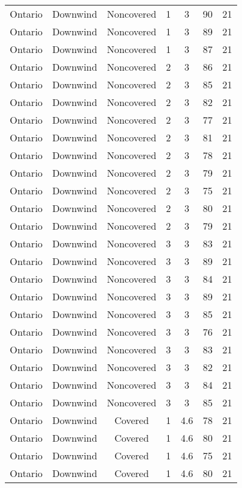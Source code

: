 \documentclass{article}
\begin{document}
\begin{longtable}[H]{ccccccc}
Ontario & Downwind & Noncovered & 1 & 3    & 90  & 21 \\
Ontario & Downwind & Noncovered & 1 & 3    & 89  & 21 \\
Ontario & Downwind & Noncovered & 1 & 3    & 87  & 21 \\
Ontario & Downwind & Noncovered & 2 & 3    & 86  & 21 \\
Ontario & Downwind & Noncovered & 2 & 3    & 85  & 21 \\
Ontario & Downwind & Noncovered & 2 & 3    & 82  & 21 \\
Ontario & Downwind & Noncovered & 2 & 3    & 77  & 21 \\
Ontario & Downwind & Noncovered & 2 & 3    & 81  & 21 \\
Ontario & Downwind & Noncovered & 2 & 3    & 78  & 21 \\
Ontario & Downwind & Noncovered & 2 & 3    & 79  & 21 \\
Ontario & Downwind & Noncovered & 2 & 3    & 75  & 21 \\
Ontario & Downwind & Noncovered & 2 & 3    & 80  & 21 \\
Ontario & Downwind & Noncovered & 2 & 3    & 79  & 21 \\
Ontario & Downwind & Noncovered & 3 & 3    & 83  & 21 \\
Ontario & Downwind & Noncovered & 3 & 3    & 89  & 21 \\
Ontario & Downwind & Noncovered & 3 & 3    & 84  & 21 \\
Ontario & Downwind & Noncovered & 3 & 3    & 89  & 21 \\
Ontario & Downwind & Noncovered & 3 & 3    & 85  & 21 \\
Ontario & Downwind & Noncovered & 3 & 3    & 76  & 21 \\
Ontario & Downwind & Noncovered & 3 & 3    & 83  & 21 \\
Ontario & Downwind & Noncovered & 3 & 3    & 82  & 21 \\
Ontario & Downwind & Noncovered & 3 & 3    & 84  & 21 \\
Ontario & Downwind & Noncovered & 3 & 3    & 85  & 21 \\
Ontario & Downwind & Covered     & 1 & 4.6  & 78  & 21 \\
Ontario & Downwind & Covered     & 1 & 4.6  & 80  & 21 \\
Ontario & Downwind & Covered     & 1 & 4.6  & 75  & 21 \\
Ontario & Downwind & Covered     & 1 & 4.6  & 80  & 21 \\

\end{longtable}
\end{document}

